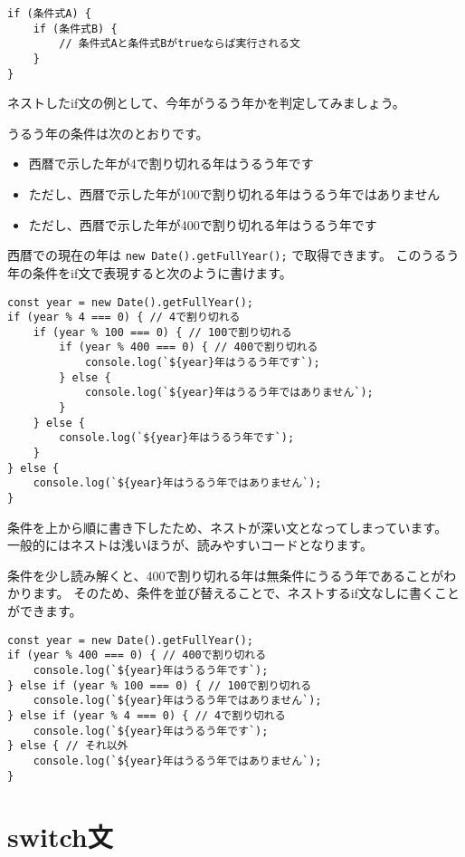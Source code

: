 \begin{lstlisting}
if (条件式A) {
    if (条件式B) {
        // 条件式Aと条件式Bがtrueならば実行される文
    }
}
\end{lstlisting}

ネストしたif文の例として、今年がうるう年かを判定してみましょう。

うるう年の条件は次のとおりです。

\begin{itemize}
\item
  西暦で示した年が4で割り切れる年はうるう年です
\item
  ただし、西暦で示した年が100で割り切れる年はうるう年ではありません
\item
  ただし、西暦で示した年が400で割り切れる年はうるう年です
\end{itemize}

西暦での現在の年は \texttt{new Date().getFullYear();}
で取得できます。
このうるう年の条件をif文で表現すると次のように書けます。

\begin{lstlisting}
const year = new Date().getFullYear();
if (year % 4 === 0) { // 4で割り切れる
    if (year % 100 === 0) { // 100で割り切れる
        if (year % 400 === 0) { // 400で割り切れる
            console.log(`${year}年はうるう年です`);
        } else {
            console.log(`${year}年はうるう年ではありません`);
        }
    } else {
        console.log(`${year}年はうるう年です`);
    }
} else {
    console.log(`${year}年はうるう年ではありません`);
}
\end{lstlisting}

条件を上から順に書き下したため、ネストが深い文となってしまっています。
一般的にはネストは浅いほうが、読みやすいコードとなります。

条件を少し読み解くと、400で割り切れる年は無条件にうるう年であることがわかります。
そのため、条件を並び替えることで、ネストするif文なしに書くことができます。

\begin{lstlisting}
const year = new Date().getFullYear();
if (year % 400 === 0) { // 400で割り切れる
    console.log(`${year}年はうるう年です`);
} else if (year % 100 === 0) { // 100で割り切れる
    console.log(`${year}年はうるう年ではありません`);
} else if (year % 4 === 0) { // 4で割り切れる
    console.log(`${year}年はうるう年です`);
} else { // それ以外
    console.log(`${year}年はうるう年ではありません`);
}
\end{lstlisting}

\hypertarget{switch-statement}{%
\section{switch文}\label{switch-statement}}

